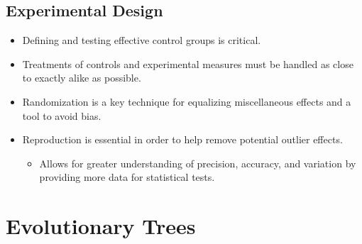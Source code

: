 \documentclass[12pt,a4paper]{article}
\begin{document}
\subsection{Experimental Design}
\begin{itemize}
    \item Defining and testing effective control groups is critical.
    \item Treatments of controls and experimental measures must be handled as close to exactly alike as possible.
    \item Randomization is a key technique for equalizing miscellaneous effects and a tool to avoid bias.
    \item Reproduction is essential in order to help remove potential outlier effects.
        \begin{itemize}
            \item Allows for greater understanding of precision, accuracy, and variation by providing more data for statistical tests.
        \end{itemize}
\end{itemize}

\clearpage
\setcounter{section}{3}
\section{Evolutionary Trees}
\end{document}
